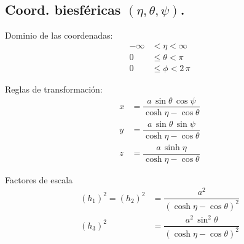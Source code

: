 \documentclass[12pt]{article}
\numberwithin{equation}{section}
\begin{document}
\subsection{Coord. biesféricas \texorpdfstring{$(\eta, \theta, \psi)$}{(e, t, p)}.}

Dominio de las coordenadas:
\begin{align*}
-\infty &< \eta < \infty \\
0 &\leq \theta < \pi \\
0 &\leq \phi < 2\, \pi
\end{align*}

Reglas de transformación:
\begin{align*}
x &= \dfrac{a \, \sin \theta \, \cos \psi}{\cosh \eta - \cos \theta} \\[0.5em]
y &= \dfrac{a \, \sin \theta \, \sin \psi}{\cosh \eta - \cos \theta} \\[0.5em]
z &= \dfrac{a \, \sinh \eta}{\cosh \eta - \cos \theta}
\end{align*}

Factores de escala
\begin{align*}
(h_{1})^{2} = (h_{2})^{2} &= \dfrac{a^{2}}{(\cosh \eta - \cos \theta)^{2}} \\[0.5em]
(h_{3})^{2} &= \dfrac{a^{2} \, \sin^{2} \theta}{(\cosh \eta - \cos \theta)^{2}}
\end{align*}
\end{document}
